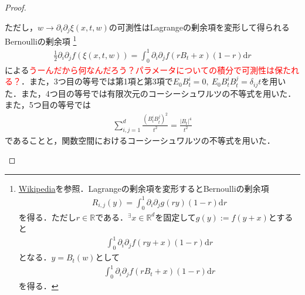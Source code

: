 \documentclass[dvipdfmx]{jsarticle}
\newtheorem{proof}{証明}
\begin{document}
\begin{proof}
\begin{enumerate}
ただし，$w\to\partial_i\partial_j\xi(x,t,w)$の可測性はLagrangeの剰余項を変形して得られるBernoulliの剰余項
\footnote{
\href{https://ja.wikipedia.org/wiki/\%E3\%83\%86\%E3\%82\%A4\%E3\%83\%A9\%E3\%83\%BC\%E3\%81\%AE\%E5\%AE\%9A\%E7\%90\%86\#.E5.A4.9A.E5.A4.89.E6.95.B0.E9.96.A2.E6.95.B0.E3.81.AB.E5.AF.BE.E3.81.99.E3.82.8B.E3.83.86.E3.82.A4.E3.83.A9.E3.83.BC.E3.81.AE.E5.AE.9A.E7.90.86}{Wikipedia}を参照．Lagrangeの剰余項を変形するとBernoulliの剰余項
\begin{align*}
R_{i,j}(y)=\int_0^1 \partial_i\partial_jg(ry)(1-r)\mathrm{d}r
\end{align*}
を得る．ただし$r\in\mathbb{R}$である．$^\exists x\in\mathbb{R}^d$を固定して$g(y):=f(y+x)$とすると
\begin{align*}
\int_0^1 \partial_i\partial_jf(ry+x)(1-r)\mathrm{d}r
\end{align*}
となる．$y=B_t(w)$として
\begin{align*}
\int_0^1 \partial_i\partial_jf(rB_t+x)(1-r)\mathrm{d}r
\end{align*}
を得る．
}
\begin{align*}
\frac{1}{2}\partial_i\partial_j f(\xi(x,t,w))=\int_0^1 \partial_i\partial_jf(rB_t+x)(1-r)\mathrm{d}r
\end{align*}
による\textcolor{red}{うーんだから何なんだろう？パラメータについての積分で可測性は保たれる？}．また，3つ目の等号では第1項と第3項で$E_0B_t^i=0,{\ }E_0B_t^iB_t^j=\delta_{ij}t$を用いた．また，4つ目の等号では有限次元のコーシーシュワルツの不等式を用いた．また，5つ目の等号では
\begin{align*}
\sum_{i,j=1}^d\frac{(B_t^iB_t^j)^2}{t^2}=\frac{|B_t|^4}{t^2}
\end{align*}
であることと，関数空間におけるコーシーシュワルツの不等式を用いた．

\end{enumerate}
\end{proof}
\end{document}

